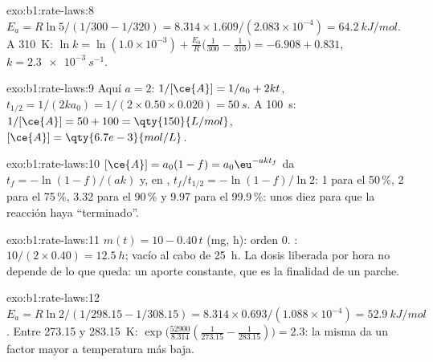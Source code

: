 \begin{solution}{exo:b1:rate-laws:8}
$E_a = R\ln5/(1/300 - 1/320) = 8.314 \times 1.609/(2.083 \times 10^{-4}) =
\qty{64.2}{kJ/mol}$. A \qty{310}{K}: $\ln k = \ln(1.0 \times 10^{-3}) +
\frac{E_a}{R}\big(\frac{1}{300} - \frac{1}{310}\big) = -6.908 + 0.831$,
$k = \qty{2.3e-3}{s^{-1}}$.
\end{solution}

\begin{solution}{exo:b1:rate-laws:9}
Aquí $a = 2$: $1/[\ce{A}] = 1/a_0 + 2kt$, $t_{1/2} = 1/(2k a_0) = 1/(2
\times 0.50 \times 0.020) = \qty{50}{s}$. A \qty{100}{s}: $1/[\ce{A}] = 50
+ 100 = \qty{150}{L/mol}$, $[\ce{A}] = \qty{6.7e-3}{mol/L}$.
\end{solution}

\begin{solution}{exo:b1:rate-laws:10}
$[\ce{A}] = a_0(1 - f) = a_0\eu^{-akt_f}$ da $t_f = -\ln(1-f)/(ak)$ y, en
, $t_f/t_{1/2} = -\ln(1-f)/\ln2$: 1 para el
50\,\%, 2 para el 75\,\%, 3.32 para el 90\,\% y 9.97 para el 99.9\,\%:
unos diez  para que la reacción haya
``terminado''.
\end{solution}

\begin{solution}{exo:b1:rate-laws:11}
$m(t) = 10 - 0.40\,t$ (\unit{mg}, \unit{h}): orden 0. : $10/(2 \times 0.40) = \qty{12.5}{h}$; vacío al cabo de
\qty{25}{h}. La dosis liberada por hora no depende de lo que queda: un
aporte constante, que es la finalidad de un parche.
\end{solution}

\begin{solution}{exo:b1:rate-laws:12}
$E_a = R\ln2/(1/298.15 - 1/308.15) = 8.314 \times 0.693/(1.088 \times
10^{-4}) = \qty{52.9}{kJ/mol}$. Entre 273.15 y \qty{283.15}{K}:
$\exp\big(\frac{52900}{8.314}(\frac{1}{273.15} - \frac{1}{283.15})\big) =
2.3$: la misma  da un factor mayor a temperatura más
baja.
\end{solution}

